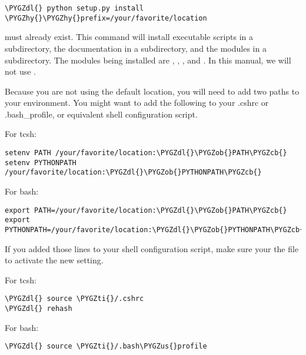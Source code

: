 \documentclass[letterpaper,10pt,english]{sphinxmanual}
\def\PYGZus{\char`\_}
\def\PYGZob{\char`\{}
\def\PYGZcb{\char`\}}
\def\PYGZdl{\char`\$}
\def\PYGZhy{\char`\-}
\def\PYGZti{\char`\~}
\begin{document}
\begin{Verbatim}[commandchars=\\\{\}]
\PYGZdl{} python setup.py install \PYGZhy{}\PYGZhy{}prefix=/your/favorite/location
\end{Verbatim}

 must already exist.  This command will install executable
scripts in a  subdirectory, the documentation in a  subdirectory,
and the modules in a  subdirectory.  The modules being
installed are , , , and .
In this manual, we will not use .

Because you are not using the default location, you will need to add two paths to
your environment.  You might want to add the following to your .cshrc or .bash\_profile,
or equivalent shell configuration script.

For tcsh:

\begin{Verbatim}[commandchars=\\\{\}]
setenv PATH /your/favorite/location:\PYGZdl{}\PYGZob{}PATH\PYGZcb{}
setenv PYTHONPATH /your/favorite/location:\PYGZdl{}\PYGZob{}PYTHONPATH\PYGZcb{}
\end{Verbatim}

For bash:

\begin{Verbatim}[commandchars=\\\{\}]
export PATH=/your/favorite/location:\PYGZdl{}\PYGZob{}PATH\PYGZcb{}
export PYTHONPATH=/your/favorite/location:\PYGZdl{}\PYGZob{}PYTHONPATH\PYGZcb{}
\end{Verbatim}

If you added those lines to your shell configuration script, make sure your 
the file to activate the new setting.

For tcsh:

\begin{Verbatim}[commandchars=\\\{\}]
\PYGZdl{} source \PYGZti{}/.cshrc
\PYGZdl{} rehash
\end{Verbatim}

For bash:

\begin{Verbatim}[commandchars=\\\{\}]
\PYGZdl{} source \PYGZti{}/.bash\PYGZus{}profile
\end{Verbatim}
\end{document}
